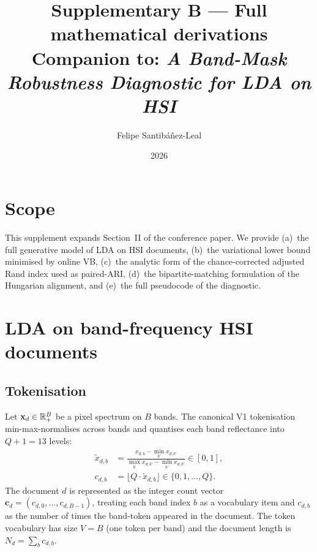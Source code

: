 \documentclass[11pt,a4paper]{article}
\title{Supplementary B --- Full mathematical derivations\\
{\large Companion to: \emph{A Band-Mask Robustness Diagnostic for LDA on HSI}}}
\author{Felipe Santib\'a\~nez-Leal}
\date{2026}
\begin{document}
\maketitle

\section{Scope}
This supplement expands Section~II of the conference paper. We
provide (a)~the full generative model of LDA on HSI documents,
(b)~the variational lower bound minimised by online VB,
(c)~the analytic form of the chance-corrected
adjusted Rand index used as paired-ARI, (d)~the bipartite-matching
formulation of the Hungarian alignment, and (e)~the full pseudocode
of the diagnostic.

\section{LDA on band-frequency HSI documents}

\subsection{Tokenisation}

Let $\mathbf{x}_d \in \mathbb{R}_+^B$ be a pixel spectrum on $B$ bands. The
canonical V1 tokenisation min-max-normalises across bands and
quantises each band reflectance into $Q+1 = 13$ levels:
\begin{align}
\tilde{x}_{d,b}
&= \frac{x_{d,b} - \min_{b'} x_{d,b'}}{\max_{b'} x_{d,b'} - \min_{b'} x_{d,b'}}
\in [0, 1],
\\
c_{d,b}
&= \lfloor Q \cdot \tilde{x}_{d,b} \rfloor
\in \{0, 1, \ldots, Q\}.
\end{align}
The document $d$ is represented as the integer count vector
$\mathbf{c}_d = (c_{d,0}, \ldots, c_{d,B-1})$, treating each band
index $b$ as a vocabulary item and $c_{d,b}$ as the number of times
the band-token appeared in the document. The token vocabulary has
size $V = B$ (one token per band) and the document length is
$N_d = \sum_b c_{d,b}$.
\end{document}
